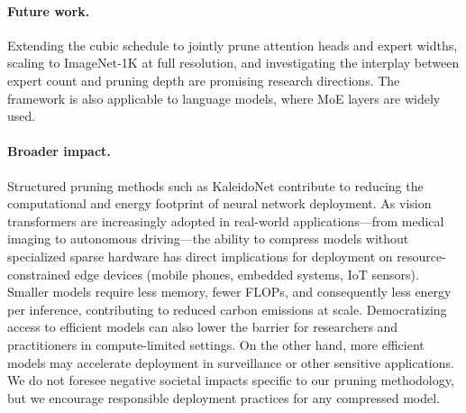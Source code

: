 \paragraph{Future work.}
Extending the cubic schedule to jointly prune attention heads and expert widths, scaling to ImageNet-1K at full resolution, and investigating the interplay between expert count and pruning depth are promising research directions. The framework is also applicable to language models, where MoE layers are widely used.

\paragraph{Broader impact.}
Structured pruning methods such as KaleidoNet contribute to reducing the computational and energy footprint of neural network deployment. As vision transformers are increasingly adopted in real-world applications---from medical imaging to autonomous driving---the ability to compress models without specialized sparse hardware has direct implications for deployment on resource-constrained edge devices (mobile phones, embedded systems, IoT sensors). Smaller models require less memory, fewer FLOPs, and consequently less energy per inference, contributing to reduced carbon emissions at scale. Democratizing access to efficient models can also lower the barrier for researchers and practitioners in compute-limited settings. On the other hand, more efficient models may accelerate deployment in surveillance or other sensitive applications. We do not foresee negative societal impacts specific to our pruning methodology, but we encourage responsible deployment practices for any compressed model.
